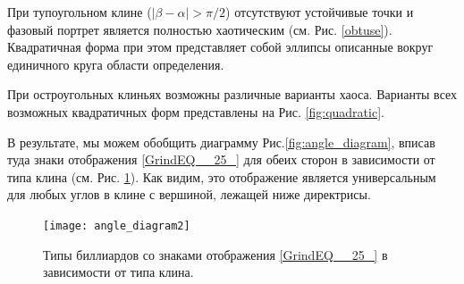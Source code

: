 \documentclass[a4paper]{article}
\begin{document}
 При тупоугольном клине ($|\beta-\alpha|>\pi/2$) отсутствуют устойчивые точки и фазовый портрет является полностью хаотическим (см. Рис. \ref{obtuse}). Квадратичная форма при этом представляет собой эллипсы описанные вокруг единичного круга области определения. 
 
 При остроугольных клиньях возможны различные варианты хаоса. 
Варианты всех возможных квадратичных форм представлены на Рис. \ref{fig:quadratic}.\

В результате, мы можем обобщить диаграмму Рис.\ref{fig:angle_diagram}, вписав туда знаки отображения \eqref{GrindEQ__25_} для обеих сторон в зависимости от типа клина (см. Рис. \ref{fig:angle_diagram2}). Как видим, это отображение является универсальным для любых углов в клине с вершиной, лежащей ниже директрисы.

\begin{figure}[ht]
  \centering
  \texttt{[image: angle\_diagram2]}\\
  \caption{Типы биллиардов со знаками отображения \eqref{GrindEQ__25_} в зависимости от типа клина.}\label{fig:angle_diagram2}
\end{figure}
\end{document}
